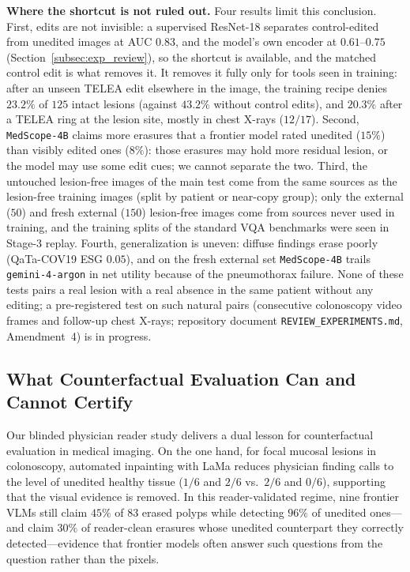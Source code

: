 \documentclass[5p,times,twocolumn,authoryear]{elsarticle}
\begin{document}
\textbf{Where the shortcut is not ruled out.} Four results limit this conclusion. First, edits are not invisible: a supervised ResNet-18 separates control-edited from unedited images at AUC $0.83$, and the model's own encoder at $0.61$--$0.75$ (Section~\ref{subsec:exp_review}), so the shortcut is available, and the matched control edit is what removes it. It removes it fully only for tools seen in training: after an unseen TELEA edit elsewhere in the image, the training recipe denies $23.2\%$ of $125$ intact lesions (against $43.2\%$ without control edits), and $20.3\%$ after a TELEA ring at the lesion site, mostly in chest X-rays ($12/17$). Second, \texttt{MedScope-4B} claims more erasures that a frontier model rated unedited ($15\%$) than visibly edited ones ($8\%$): those erasures may hold more residual lesion, or the model may use some edit cues; we cannot separate the two. Third, the untouched lesion-free images of the main test come from the same sources as the lesion-free training images (split by patient or near-copy group); only the external ($50$) and fresh external ($150$) lesion-free images come from sources never used in training, and the training splits of the standard VQA benchmarks were seen in Stage-3 replay. Fourth, generalization is uneven: diffuse findings erase poorly (QaTa-COV19 ESG $0.05$), and on the fresh external set \texttt{MedScope-4B} trails \texttt{gemini-4-argon} in net utility because of the pneumothorax failure. None of these tests pairs a real lesion with a real absence in the same patient without any editing; a pre-registered test on such natural pairs (consecutive colonoscopy video frames and follow-up chest X-rays; repository document \texttt{REVIEW\_EXPERIMENTS.md}, Amendment~4) is in progress.

\subsection{What Counterfactual Evaluation Can and Cannot Certify}
\label{subsec:disc_certify}
Our blinded physician reader study delivers a dual lesson for counterfactual evaluation in medical imaging. On the one hand, for focal mucosal lesions in colonoscopy, automated inpainting with LaMa reduces physician finding calls to the level of unedited healthy tissue ($1/6$ and $2/6$ vs.\ $2/6$ and $0/6$), supporting that the visual evidence is removed. In this reader-validated regime, nine frontier VLMs still claim $45\%$ of $83$ erased polyps while detecting $96\%$ of unedited ones---and claim $30\%$ of reader-clean erasures whose unedited counterpart they correctly detected---evidence that frontier models often answer such questions from the question rather than the pixels.
\end{document}
